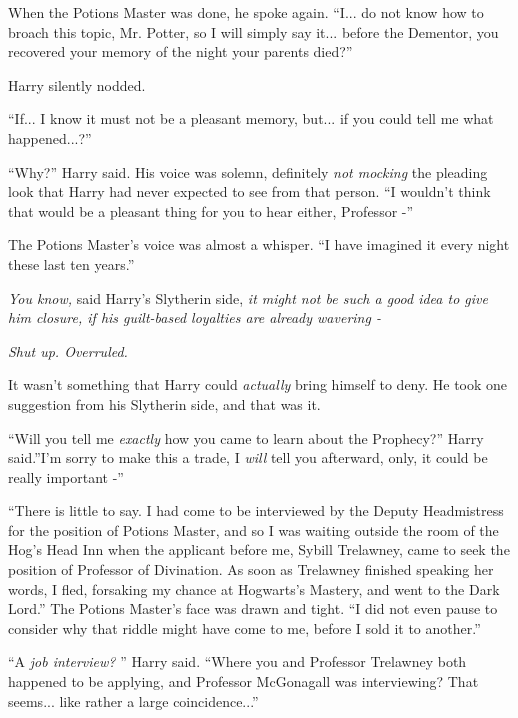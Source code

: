 When the Potions Master was done, he spoke again. ``I... do not
know how to broach this topic, Mr. Potter, so I will simply say
it... before the Dementor, you recovered your memory of the night
your parents died?''

Harry silently nodded.

``If... I know it must not be a pleasant memory, but... if you
could tell me what happened...?''

``Why?'' Harry said. His voice was solemn, definitely \emph{not mocking}
the pleading look that Harry had never expected to see from that person.
``I wouldn't think that would be a pleasant thing for you to hear
either, Professor -''

The Potions Master's voice was almost a whisper. ``I have imagined it
every night these last ten years.''

\emph{You know,} said Harry's Slytherin side, \emph{it might not be such
a good idea to give him closure, if his guilt-based loyalties are
already wavering -}

\emph{Shut up. Overruled.}

It wasn't something that Harry could \emph{actually} bring himself to
deny. He took one suggestion from his Slytherin side, and that was it.

``Will you tell me \emph{exactly} how you came to learn about the
Prophecy?'' Harry said.''I'm sorry to make this a trade, I \emph{will}
tell you afterward, only, it could be really important -''

``There is little to say. I had come to be interviewed by the Deputy
Headmistress for the position of Potions Master, and so I was waiting
outside the room of the Hog's Head Inn when the applicant before me,
Sybill Trelawney, came to seek the position of Professor of Divination.
As soon as Trelawney finished speaking her words, I fled, forsaking my
chance at Hogwarts's Mastery, and went to the Dark Lord.'' The Potions
Master's face was drawn and tight. ``I did not even pause to consider
why that riddle might have come to me, before I sold it to another.''

``A \emph{job interview?} '' Harry said. ``Where you and Professor
Trelawney both happened to be applying, and Professor McGonagall was
interviewing? That seems... like rather a large
coincidence...''

